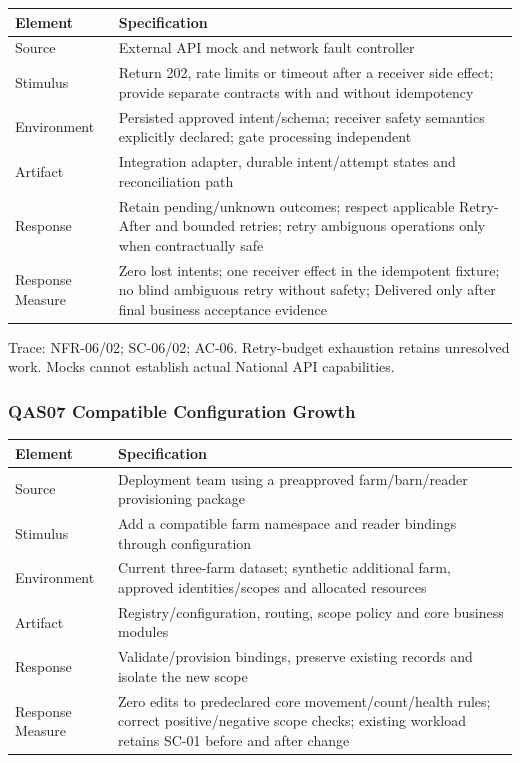 {\small
\begin{longtable}[]{|>{\raggedright\arraybackslash}p{}|>{\raggedright\arraybackslash}p{}|}
\hline
\textbf{Element} & \textbf{Specification} \\ \hline
\endhead
Source & External API mock and network fault controller \\ \hline
Stimulus & Return 202, rate limits or timeout after a receiver side
effect; provide separate contracts with and without idempotency \\ \hline
Environment & Persisted approved intent/schema; receiver safety
semantics explicitly declared; gate processing independent \\ \hline
Artifact & Integration adapter, durable intent/attempt states and
reconciliation path \\ \hline
Response & Retain pending/unknown outcomes; respect applicable
Retry-After and bounded retries; retry ambiguous operations only when
contractually safe \\ \hline
Response Measure & Zero lost intents; one receiver effect in the
idempotent fixture; no blind ambiguous retry without safety; Delivered
only after final business acceptance evidence \\ \hline
\end{longtable}
}

Trace: NFR-06/02; SC-06/02; AC-06. Retry-budget exhaustion retains
unresolved work. Mocks cannot establish actual National API
capabilities.

\subsubsection{QAS07 Compatible Configuration Growth}\label{sec:3.4.7}

{\small
\begin{longtable}[]{|>{\raggedright\arraybackslash}p{}|>{\raggedright\arraybackslash}p{}|}
\hline
\textbf{Element} & \textbf{Specification} \\ \hline
\endhead
Source & Deployment team using a preapproved farm/barn/reader
provisioning package \\ \hline
Stimulus & Add a compatible farm namespace and reader bindings through
configuration \\ \hline
Environment & Current three-farm dataset; synthetic additional farm,
approved identities/scopes and allocated resources \\ \hline
Artifact & Registry/configuration, routing, scope policy and core
business modules \\ \hline
Response & Validate/provision bindings, preserve existing records and
isolate the new scope \\ \hline
Response Measure & Zero edits to predeclared core movement/count/health
rules; correct positive/negative scope checks; existing workload retains
SC-01 before and after change \\ \hline
\end{longtable}
}

